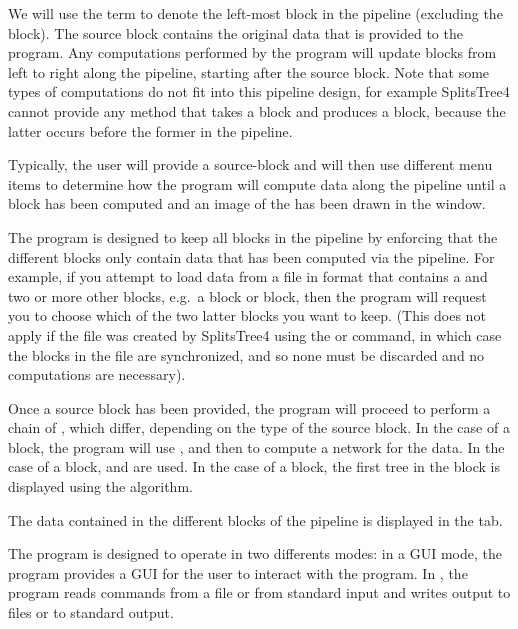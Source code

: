 \documentclass[11pt]{article}
\def\SplitsTree{{\sf SplitsTree4 }}
\begin{document}
We will use the term  to denote the left-most block
in the pipeline (excluding the  block). The source block
contains the original data that is provided to the program.
Any computations performed by the program will update blocks from left to
right along the pipeline, starting after the source block.
Note that some types of computations do not fit into this
pipeline design,  for example \SplitsTree cannot provide any method that
takes a  block and produces a  block, because
the latter occurs before the former in the pipeline.

Typically, the user will provide a source-block and
will then use different menu items to determine how the program will compute
data
along the pipeline until a  block has been computed and
an image of the  has been drawn in the
 window.

The program is designed to keep all blocks in the pipeline 
by enforcing that the different blocks only contain data that
has been computed via the pipeline. For example, if you attempt
to load data from a file in  format that contains a
 and two or more other blocks, e.g.\ a  block
or  block, then the program will request you to choose
which of the two latter blocks you want to keep. (This does not apply
if the file was created by \SplitsTree using the 
or  command, in which case the blocks in the file
are synchronized, and so none must be discarded
and no computations are necessary).

Once a source block has been provided, the program will proceed
to perform a chain of , which differ,
depending on the type of the source block.
In the case of a  block, the
program will use ,
 and then  to compute a network for
the data. In the case of a  block,
 and  are used.
In the case of a  block, the first tree in the block is
displayed using the  algorithm.

The data contained in the different blocks of the pipeline is displayed
in the  tab.

The program is designed to operate in two differents modes:
in a GUI mode, the program provides a GUI for the user to interact with the
program. In , the program reads commands from a file
or from standard input and writes output to files or to standard output.
\end{document}
